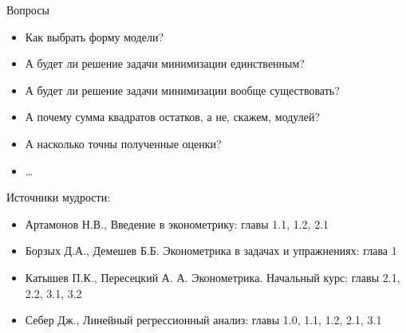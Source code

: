 \documentclass[russian,ignorenonframetext,]{beamer}
\begin{document}
\begin{frame}{Вопросы}

\begin{itemize}
\item
  Как выбрать форму модели?
\item
  А будет ли решение задачи минимизации единственным?
\item
  А будет ли решение задачи минимизации вообще существовать?
\item
  А почему сумма квадратов остатков, а не, скажем, модулей?
\item
  А насколько точны полученные оценки?
\item
  \ldots{}
\end{itemize}

\end{frame}

\begin{frame}{Источники мудрости:}

\begin{itemize}
\item
  Артамонов Н.В., Введение в эконометрику: главы 1.1, 1.2, 2.1
\item
  Борзых Д.А., Демешев Б.Б. Эконометрика в задачах и упражнениях: глава
  1
\item
  Катышев П.К., Пересецкий А. А. Эконометрика. Начальный курс: главы
  2.1, 2.2, 3.1, 3.2
\item
  Себер Дж., Линейный регрессионный анализ: главы 1.0, 1.1, 1.2, 2.1,
  3.1
\end{itemize}

\end{frame}
\end{document}
